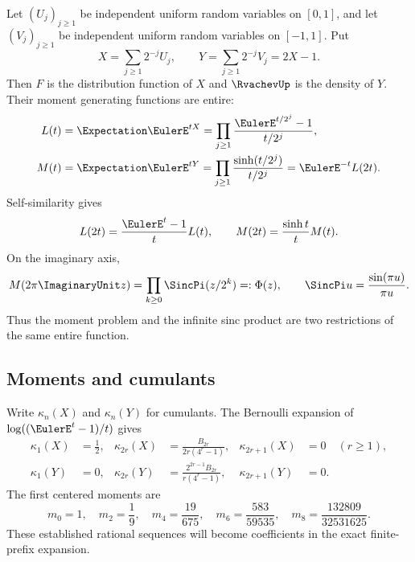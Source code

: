\documentclass[11pt,oneside]{article}
\numberwithin{equation}{section}
\theoremstyle{definition}
\theoremstyle{remark}
\begin{document}
Let $(U_j)_{j\ge1}$ be independent uniform random variables on $[0,1]$, and let
$(V_j)_{j\ge1}$ be independent uniform random variables on $[-1,1]$.  Put
\begin{equation}
 X=\sum_{j\ge1}2^{-j}U_j,
 \qquad
 Y=\sum_{j\ge1}2^{-j}V_j=2X-1.
 \label{p2:eq:XY-series}
\end{equation}
Then $F$ is the distribution function of $X$ and $\RvachevUp$ is the density of $Y$.  Their moment
generating functions are entire:
\begin{align}
 L(t)&=\Expectation\EulerE^{tX}
 =\prod_{j\ge1}\frac{\EulerE^{t/2^j}-1}{t/2^j},
 \label{p2:eq:L-def}\\
 M(t)&=\Expectation\EulerE^{tY}
 =\prod_{j\ge1}\frac{\sinh(t/2^j)}{t/2^j}
 =\EulerE^{-t}L(2t).
 \label{p2:eq:M-def}
\end{align}
Self-similarity gives
\begin{equation}
 L(2t)=\frac{\EulerE^t-1}{t}L(t),
 \qquad
 M(2t)=\frac{\sinh t}{t}M(t).
 \label{p2:eq:mgf-refinement}
\end{equation}
On the imaginary axis,
\begin{equation}
 M(2\pi\ImaginaryUnit z)=\prod_{k\ge0}\SincPi(z/2^k)=:\Phi(z),
 \qquad \SincPi u=\frac{\sin(\pi u)}{\pi u}.
 \label{p2:eq:M-Phi}
\end{equation}
Thus the moment problem and the infinite sinc product are two restrictions of the same entire
function.

\subsection{Moments and cumulants}

Write $\kappa_n(X)$ and $\kappa_n(Y)$ for cumulants.  The Bernoulli expansion of
$\log((\EulerE^t-1)/t)$ gives
\begin{align}
 \kappa_1(X)&=\frac12,
 &\kappa_{2r}(X)&=\frac{B_{2r}}{2r(4^r-1)},
 &\kappa_{2r+1}(X)&=0\quad(r\ge1),
 \label{p2:eq:X-cumulants}\\
 \kappa_1(Y)&=0,
 &\kappa_{2r}(Y)&=\frac{2^{2r-1}B_{2r}}{r(4^r-1)},
 &\kappa_{2r+1}(Y)&=0.
 \label{p2:eq:Y-cumulants}
\end{align}
The first centered moments are
\begin{equation}
 m_0=1,
 \quad m_2=\frac19,
 \quad m_4=\frac{19}{675},
 \quad m_6=\frac{583}{59535},
 \quad m_8=\frac{132809}{32531625}.
 \label{p2:eq:Y-moments}
\end{equation}
These established rational sequences will become coefficients in the exact finite-prefix expansion.
\end{document}
